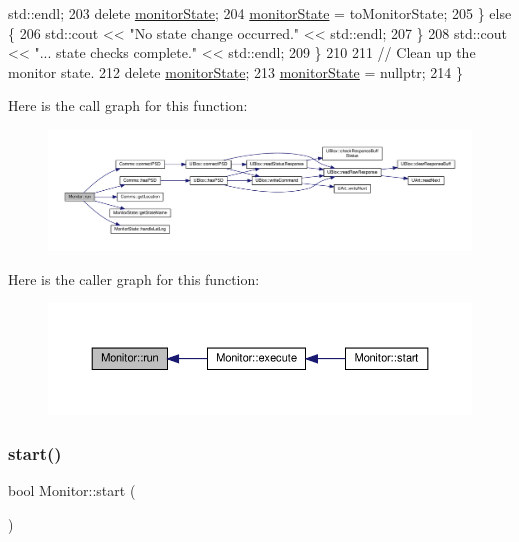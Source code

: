 \begin{DoxyCode}
      std::endl;
203             \textcolor{keyword}{delete} \hyperlink{class_monitor_a56b40e06ac7f2f36520e82ee01a17d4c}{monitorState};
204             \hyperlink{class_monitor_a56b40e06ac7f2f36520e82ee01a17d4c}{monitorState} = toMonitorState;
205         \} \textcolor{keywordflow}{else} \{
206             std::cout << \textcolor{stringliteral}{"No state change occurred."} << std::endl;
207         \}
208         std::cout << \textcolor{stringliteral}{"... state checks complete."} << std::endl;
209     \}
210 
211     \textcolor{comment}{// Clean up the monitor state.}
212     \textcolor{keyword}{delete} \hyperlink{class_monitor_a56b40e06ac7f2f36520e82ee01a17d4c}{monitorState};
213     \hyperlink{class_monitor_a56b40e06ac7f2f36520e82ee01a17d4c}{monitorState} = \textcolor{keyword}{nullptr};
214 \}
\end{DoxyCode}
Here is the call graph for this function\+:\nopagebreak
\begin{figure}[H]
\begin{center}
\leavevmode
\includegraphics[width=350pt]{d9/df7/class_monitor_a81666ecd4a8db05fd3090f7e47eca6ed_cgraph}
\end{center}
\end{figure}
Here is the caller graph for this function\+:\nopagebreak
\begin{figure}[H]
\begin{center}
\leavevmode
\includegraphics[width=350pt]{d9/df7/class_monitor_a81666ecd4a8db05fd3090f7e47eca6ed_icgraph}
\end{center}
\end{figure}
\mbox{\label{class_monitor_a71dfa92dfa25ee137f4e3d5e01a8d673}} 
\subsubsection{\texorpdfstring{start()}{start()}\hspace{0.1cm}{\footnotesize\ttfamily [1/2]}}
{\footnotesize\ttfamily bool Monitor\+::start (\begin{DoxyParamCaption}{ }\end{DoxyParamCaption})}

